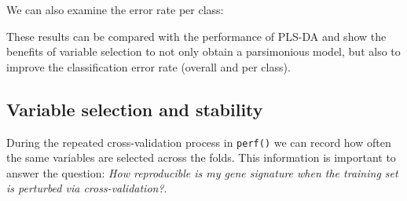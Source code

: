 \documentclass[
]{book}
\newenvironment{Shaded}{\begin{snugshade}}{\end{snugshade}}
\newcommand{\AttributeTok}[1]{\textcolor[rgb]{0.77,0.63,0.00}{#1}}
\newcommand{\CommentTok}[1]{\textcolor[rgb]{0.56,0.35,0.01}{\textit{#1}}}
\newcommand{\DecValTok}[1]{\textcolor[rgb]{0.00,0.00,0.81}{#1}}
\newcommand{\FunctionTok}[1]{\textcolor[rgb]{0.00,0.00,0.00}{#1}}
\newcommand{\NormalTok}[1]{#1}
\newcommand{\OtherTok}[1]{\textcolor[rgb]{0.56,0.35,0.01}{#1}}
\newcommand{\SpecialCharTok}[1]{\textcolor[rgb]{0.00,0.00,0.00}{#1}}
\newcommand{\StringTok}[1]{\textcolor[rgb]{0.31,0.60,0.02}{#1}}
\begin{document}
We can also examine the error rate per class:

\begin{Shaded}
\end{Shaded}

These results can be compared with the performance of PLS-DA and show the benefits of variable selection to not only obtain a parsimonious model, but also to improve the classification error rate (overall and per class).

\hypertarget{plsda:stab}{%
\subsection{Variable selection and stability}\label{plsda:stab}}

During the repeated cross-validation process in \texttt{perf()} we can record how often the same variables are selected across the folds. This information is important to answer the question: \emph{How reproducible is my gene signature when the training set is perturbed via cross-validation?}.

\begin{Shaded}
\end{Shaded}
\end{document}
